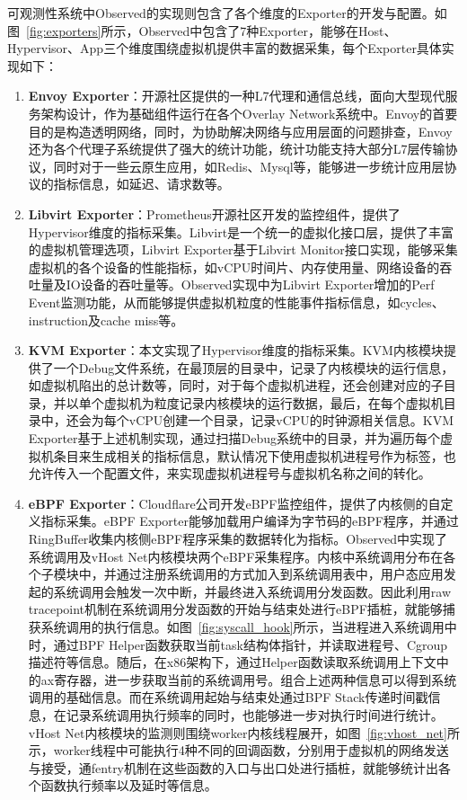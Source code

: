 可观测性系统中Observed的实现则包含了各个维度的Exporter的开发与配置。如图~\ref{fig:exporters}所示，Observed中包含了7种Exporter，能够在Host、Hypervisor、App三个维度围绕虚拟机提供丰富的数据采集，每个Exporter具体实现如下：

\begin{enumerate}
    \item \textbf{Envoy Exporter}：开源社区提供的一种L7代理和通信总线，面向大型现代服务架构设计，作为基础组件运行在各个Overlay Network系统中。Envoy的首要目的是构造透明网络，同时，为协助解决网络与应用层面的问题排查，Envoy还为各个代理子系统提供了强大的统计功能，统计功能支持大部分L7层传输协议，同时对于一些云原生应用，如Redis、Mysql等，能够进一步统计应用层协议的指标信息，如延迟、请求数等。
    
    \item \textbf{Libvirt Exporter}：Prometheus开源社区开发的监控组件，提供了Hypervisor维度的指标采集。Libvirt是一个统一的虚拟化接口层，提供了丰富的虚拟机管理选项，Libvirt Exporter基于Libvirt Monitor接口实现，能够采集虚拟机的各个设备的性能指标，如vCPU时间片、内存使用量、网络设备的吞吐量及IO设备的吞吐量等。Observed实现中为Libvirt Exporter增加的Perf Event监测功能，从而能够提供虚拟机粒度的性能事件指标信息，如cycles、instruction及cache miss等。
    
    \item \textbf{KVM Exporter}：本文实现了Hypervisor维度的指标采集。KVM内核模块提供了一个Debug文件系统，在最顶层的目录中，记录了内核模块的运行信息，如虚拟机陷出的总计数等，同时，对于每个虚拟机进程，还会创建对应的子目录，并以单个虚拟机为粒度记录内核模块的运行数据，最后，在每个虚拟机目录中，还会为每个vCPU创建一个目录，记录vCPU的时钟源相关信息。KVM Exporter基于上述机制实现，通过扫描Debug系统中的目录，并为遍历每个虚拟机条目来生成相关的指标信息，默认情况下使用虚拟机进程号作为标签，也允许传入一个配置文件，来实现虚拟机进程号与虚拟机名称之间的转化。

    \item \textbf{eBPF Exporter}：Cloudflare公司开发eBPF监控组件，提供了内核侧的自定义指标采集。eBPF Exporter能够加载用户编译为字节码的eBPF程序，并通过RingBuffer收集内核侧eBPF程序采集的数据转化为指标。Observed中实现了系统调用及vHost Net内核模块两个eBPF采集程序。内核中系统调用分布在各个子模块中，并通过注册系统调用的方式加入到系统调用表中，用户态应用发起的系统调用会触发一次中断，并最终进入系统调用分发函数。因此利用raw tracepoint机制在系统调用分发函数的开始与结束处进行eBPF插桩，就能够捕获系统调用的执行信息。如图~\ref{fig:syscall_hook}所示，当进程进入系统调用中时，通过BPF Helper函数获取当前task结构体指针，并读取进程号、Cgroup描述符等信息。随后，在x86架构下，通过Helper函数读取系统调用上下文中的ax寄存器，进一步获取当前的系统调用号。组合上述两种信息可以得到系统调用的基础信息。而在系统调用起始与结束处通过BPF Stack传递时间戳信息，在记录系统调用执行频率的同时，也能够进一步对执行时间进行统计。vHost Net内核模块的监测则围绕worker内核线程展开，如图~\ref{fig:vhost_net}所示，worker线程中可能执行4种不同的回调函数，分别用于虚拟机的网络发送与接受，通fentry机制在这些函数的入口与出口处进行插桩，就能够统计出各个函数执行频率以及延时等信息。


\end{enumerate}
